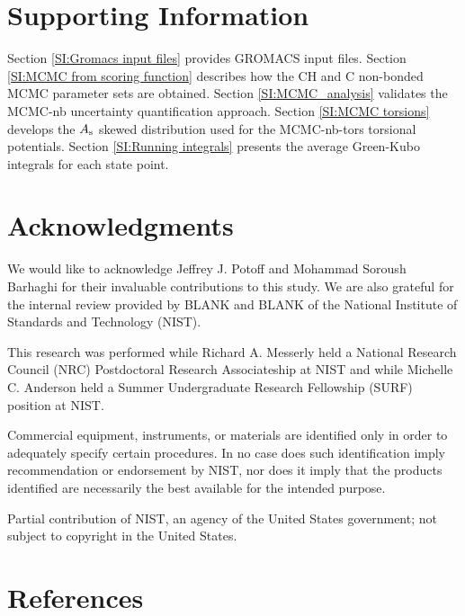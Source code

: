 \documentclass[preprint,review,12pt]{elsarticle}
\begin{document}
	\section*{Supporting Information}
	
    Section \ref{SI:Gromacs input files} provides GROMACS input files. Section \ref{SI:MCMC from scoring function} describes how the CH and C non-bonded MCMC parameter sets are obtained. Section \ref{SI:MCMC_analysis} validates the MCMC-nb uncertainty quantification approach. Section \ref{SI:MCMC torsions} develops the $A_{\rm s}$ skewed distribution used for the MCMC-nb-tors torsional potentials. Section \ref{SI:Running integrals} presents the average Green-Kubo integrals for each state point.      
	
	\section*{Acknowledgments}
	
	We would like to acknowledge Jeffrey J. Potoff and Mohammad Soroush Barhaghi for their invaluable contributions to this study. We are also grateful for the internal review provided by BLANK and BLANK of the National Institute of Standards and Technology (NIST). 
	
	This research was performed while Richard A. Messerly held a National Research Council (NRC) Postdoctoral Research Associateship at NIST and while Michelle C. Anderson held a Summer Undergraduate Research Fellowship (SURF) position at NIST. 

	Commercial equipment, instruments, or materials are identified only in order to adequately specify certain procedures. In no case does such identification imply recommendation or endorsement by NIST, nor does it imply that the products identified are necessarily the best available for the intended purpose.
	
	Partial contribution of NIST, an agency of the United States government; not subject to copyright in the United States.
	
	\section*{References}
	
	
	
		
\end{document}
